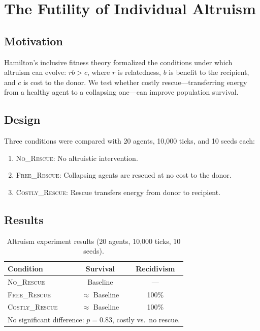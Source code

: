 \documentclass[12pt,a4paper]{article}
\begin{document}
\section{The Futility of Individual Altruism}
\label{sec:altruism}

\subsection{Motivation}

Hamilton's inclusive fitness theory \citep{hamilton1964} formalized the conditions under which altruism can evolve: $rb > c$, where $r$ is relatedness, $b$ is benefit to the recipient, and $c$ is cost to the donor. We test whether costly rescue---transferring energy from a healthy agent to a collapsing one---can improve population survival.

\subsection{Design}

Three conditions were compared with 20 agents, 10{,}000 ticks, and 10 seeds each:

\begin{enumerate}
\item \textsc{No\_Rescue}: No altruistic intervention.
\item \textsc{Free\_Rescue}: Collapsing agents are rescued at no cost to the donor.
\item \textsc{Costly\_Rescue}: Rescue transfers energy from donor to recipient.
\end{enumerate}

\subsection{Results}

\begin{table}[H]
\centering
\caption{Altruism experiment results (20 agents, 10{,}000 ticks, 10 seeds).}
\label{tab:altruism}
\begin{tabular}{@{}lcc@{}}
\toprule
\textbf{Condition} & \textbf{Survival} & \textbf{Recidivism} \\
\midrule
\textsc{No\_Rescue}     & Baseline & --- \\
\textsc{Free\_Rescue}   & $\approx$ Baseline & 100\% \\
\textsc{Costly\_Rescue} & $\approx$ Baseline & 100\% \\
\bottomrule
\multicolumn{3}{l}{\small No significant difference: $p = 0.83$, costly vs.\ no rescue.}
\end{tabular}
\end{table}
\end{document}
